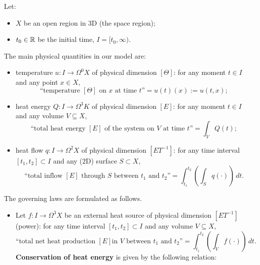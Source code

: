 \begin{discussion}
  \label{idec/heat_transport/continuous/model_with_differential_forms-discussion}
  Let:
  \begin{itemize}
    \item $X$ be an open region in $3$D (the space region);
    \item $t_0 \in \mathbb{R}$ be the initial time, $I = [t_0, \infty)$.
  \end{itemize}
  The main physical quantities in our model are:
  \begin{itemize}
    \item
      temperature $u \colon I \to \Omega^0 X$ of physical dimension $[\Theta]$:
      for any moment $t \in I$ and any point $x \in X$,
      \begin{equation}
        \text{``temperature $[\Theta]$ on $x$ at time $t$''}
        = u(t)(x) := u(t, x);
      \end{equation}
    \item
      heat energy $Q \colon I \to \Omega^3 K$ of physical dimension $[E]$:
      for any moment $t \in I$ and any volume $V \subseteq X$,
      \begin{equation}
        \text{``total heat energy $[E]$ of the system on $V$ at time $t$''}
        = \int_V Q(t);
      \end{equation}
    \item
      heat flow $q \colon I \to \Omega^2 X$ of physical dimension $[E T^{-1}]$:
      for any time interval $[t_1, t_2] \subset I$
      and any ($2$D) surface $S \subset X$,
      \begin{equation}
        \text{``total inflow $[E]$ through $S$ between $t_1$ and $t_2$''}
        = \int_{t_1}^{t_2} \left(\int_S q(\cdot) \right)\, d t.
      \end{equation}
  \end{itemize}
  The governing laws are formulated as follows.
  \begin{itemize}
    \item
      Let $f \colon I \to \Omega^3 X$ be an external heat source
      of physical dimension $[E T^{-1}]$ (power):
      for any time interval $[t_1, t_2] \subset I$
      and any volume $V \subseteq X$,
      \begin{equation}
        \text{``total net heat production $[E]$
          in $V$ between $t_1$ and $t_2$''}
        = \int_{t_1}^{t_2} \left(\int_V f(\cdot) \right)\, d t.
      \end{equation}
      \textbf{Conservation of heat energy} is given by the following relation:

\end{itemize}
\end{discussion}
